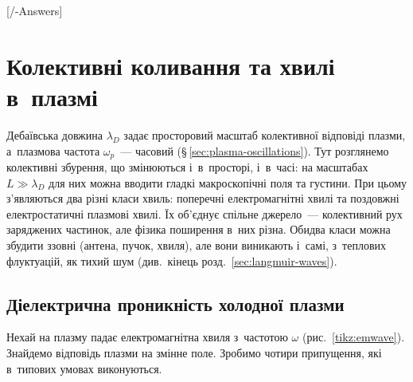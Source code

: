 

[\currfilebase/\currfilebase-Answers]
\chapter{Колективні коливання та хвилі в~плазмі}\label{sec:plasma-waves}\hypertarget{plasma-waves}{}
\graphicspath{{\currfilebase/Pictures}}

Дебаївська довжина $\lambda_D$ задає просторовий масштаб колективної відповіді плазми, а~плазмова
частота $\omega_p$~--- часовий (§\,\ref{sec:plasma-oscillations}). Тут
розглянемо колективні збурення, що змінюються і~в~просторі, і~в~часі: на масштабах
$L\gg\lambda_D$ для них можна вводити гладкі макроскопічні поля та густини. При цьому з'являються два
різні класи хвиль: поперечні електромагнітні хвилі та поздовжні електростатичні плазмові
хвилі. Їх об'єднує спільне джерело~--- колективний рух заряджених частинок, але фізика
поширення в~них різна. Обидва класи можна збудити ззовні (антена, пучок, хвиля), але
вони виникають і~самі, з~теплових флуктуацій, як тихий шум (див.\ кінець
розд.~\ref{sec:langmuir-waves}).

\section{Діелектрична проникність холодної плазми}\label{sec:plasma-permittivity}

Нехай на плазму падає електромагнітна хвиля з~частотою $\omega$ (рис.~\ref{tikz:emwave}).
Знайдемо відповідь плазми на змінне поле. Зробимо чотири припущення, які в~типових умовах
виконуються.


